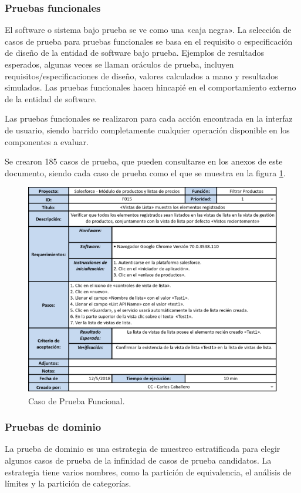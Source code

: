 \subsubsection{Pruebas funcionales}
El software o sistema bajo prueba se ve como una «caja negra». La selección de
casos de prueba para pruebas funcionales se basa en el requisito o
especificación de diseño de la entidad de software bajo prueba. Ejemplos de
resultados esperados, algunas veces se llaman oráculos de prueba, incluyen
requisitos/especificaciones de diseño, valores calculados a mano y resultados
simulados. Las pruebas funcionales hacen hincapié en el comportamiento externo
de la entidad de software\cite{Luo}.

Las pruebas funcionales se realizaron para cada acción encontrada en la interfaz
de usuario, siendo barrido completamente cualquier operación disponible en los
componentes a evaluar.

Se crearon 185 casos de prueba, que pueden consultarse en los anexos de este
documento, siendo cada caso de prueba como el que se muestra en la figura
\ref{tc_functional}.

\begin{figure}
\centering
\includegraphics[width=1.0\textwidth]{graphics/tc2-functional.eps}
\caption{Caso de Prueba Funcional.}
\label{tc_functional}
\end{figure}

\subsubsection{Pruebas de dominio}
La prueba de dominio es una estrategia de muestreo estratificada para elegir
algunos casos de prueba de la infinidad de casos de prueba candidatos. La
estrategia tiene varios nombres, como la partición de equivalencia, el análisis
de límites y la partición de categorías.


